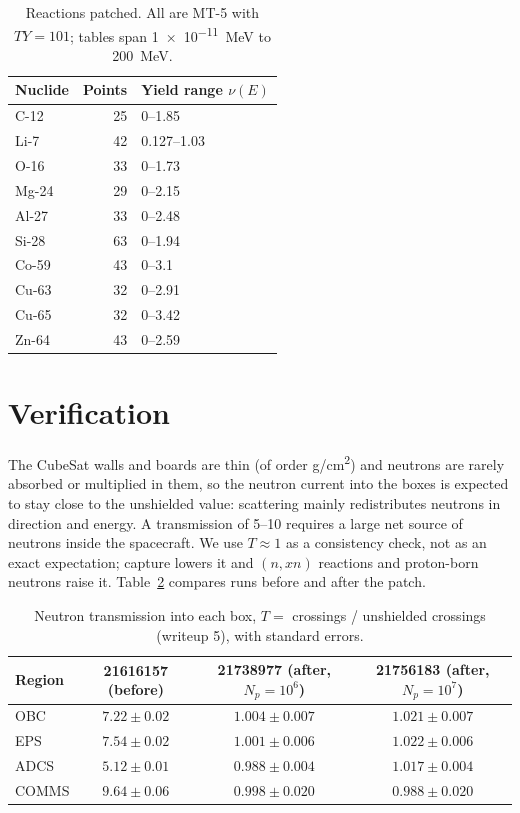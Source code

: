 \begin{table}[h]
\centering
\caption{Reactions patched. All are MT-5 with $TY=101$; tables span \SI{1e-11}{MeV} to \SI{200}{MeV}.}
\label{tab:patched}
\begin{tabular}{lrl}
\toprule
Nuclide & Points & Yield range $\nu(E)$ \\
\midrule
C-12  & 25 & 0--1.85 \\
Li-7  & 42 & 0.127--1.03 \\
O-16  & 33 & 0--1.73 \\
Mg-24 & 29 & 0--2.15 \\
Al-27 & 33 & 0--2.48 \\
Si-28 & 63 & 0--1.94 \\
Co-59 & 43 & 0--3.1 \\
Cu-63 & 32 & 0--2.91 \\
Cu-65 & 32 & 0--3.42 \\
Zn-64 & 43 & 0--2.59 \\
\bottomrule
\end{tabular}
\end{table}

\section{Verification}
The CubeSat walls and boards are thin (of order \si{g/cm^2}) and neutrons are rarely absorbed or multiplied in them, so the neutron current into the boxes is expected to stay close to the unshielded value: scattering mainly redistributes neutrons in direction and energy. A transmission of 5--10 requires a large net source of neutrons inside the spacecraft. We use $T\approx1$ as a consistency check, not as an exact expectation; capture lowers it and $(n,xn)$ reactions and proton-born neutrons raise it. Table~\ref{tab:verify} compares runs before and after the patch.

\begin{table}[h]
\centering
\caption{Neutron transmission into each box, $T=$ crossings / unshielded crossings (writeup 5), with \mcdc{} standard errors.}
\label{tab:verify}
\begin{tabular}{lccc}
\toprule
Region & 21616157 (before) & 21738977 (after, $N_p=10^6$) & 21756183 (after, $N_p=10^7$) \\
\midrule
OBC   & $7.22\pm0.02$ & $1.004\pm0.007$ & $1.021\pm0.007$ \\
EPS   & $7.54\pm0.02$ & $1.001\pm0.006$ & $1.022\pm0.006$ \\
ADCS  & $5.12\pm0.01$ & $0.988\pm0.004$ & $1.017\pm0.004$ \\
COMMS & $9.64\pm0.06$ & $0.998\pm0.020$ & $0.988\pm0.020$ \\
\bottomrule
\end{tabular}
\end{table}

